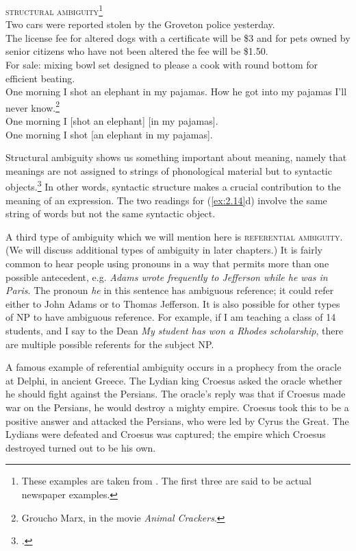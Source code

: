 \ea \label{ex:2.14}
\textsc{structural ambiguity}\footnote{These examples are taken from \citet[102]{Pinker1994}. The first three are said to be actual newspaper examples.}\\
\ea Two cars were reported stolen by the Groveton police yesterday.\\
\ex The license fee for altered dogs with a certificate will be \$3 and for pets owned by senior citizens who have not been altered the fee will be \$1.50.\\
\ex For sale: mixing bowl set designed to please a cook with round bottom for efficient beating.\\
\ex One morning I shot an elephant in my pajamas. How he got into my pajamas I’ll never know.\footnote{Groucho Marx, in the movie \textit{Animal Crackers}.}\\
\ex One morning I [shot an elephant] [in my pajamas].\\
\ex One morning I shot [an elephant in my pajamas].
                       \z
\z


Structural ambiguity shows us something important about meaning, namely that meanings are not assigned to strings of phonological material but to syntactic objects.\footnote{\citet[514]{Kennedy2011}.} In other words, syntactic structure makes a crucial contribution to the meaning of an expression. The two readings for (\ref{ex:2.14}d) involve the same string of words but not the same syntactic object.



A third type of ambiguity which we will mention here is \textsc{referential ambiguity}. (We will discuss additional types of ambiguity in later chapters.) It is fairly common to hear people using pronouns in a way that permits more than one possible antecedent, e.g. \textit{Adams wrote frequently to Jefferson while he was in Paris}. The pronoun \textit{he} in this sentence has ambiguous reference; it could refer either to John Adams or to Thomas Jefferson. It is also possible for other types of NP to have ambiguous reference. For example, if I am teaching a class of 14 students, and I say to the Dean \textit{My student has won a Rhodes scholarship}, there are multiple possible referents for the subject NP.\largerpage[1]



A famous example of referential ambiguity occurs in a prophecy from the oracle at Delphi, in ancient Greece. The Lydian king Croesus asked the oracle whether he should fight against the Persians. The oracle’s reply was that if Croesus made war on the Persians, he would destroy a mighty empire. Croesus took this to be a positive answer and attacked the Persians, who were led by Cyrus the Great. The Lydians were defeated and Croesus was captured; the empire which Croesus destroyed turned out to be his own.


